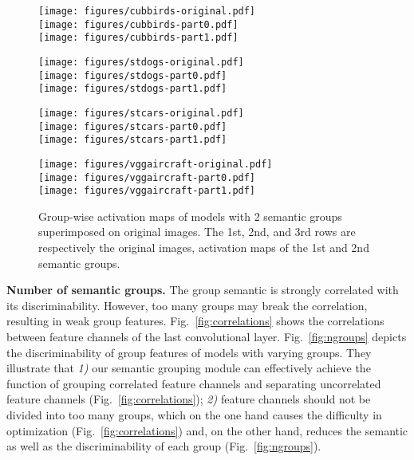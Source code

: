 \documentclass[journal]{IEEEtran}
\begin{document}
\begin{figure}[t]
\begin{center}
\begin{minipage}{0.20\linewidth}
\texttt{[image: figures/cubbirds-original.pdf]}\\
\texttt{[image: figures/cubbirds-part0.pdf]}\\
\texttt{[image: figures/cubbirds-part1.pdf]}
\end{minipage}
\begin{minipage}{0.20\linewidth}
\texttt{[image: figures/stdogs-original.pdf]}\\
\texttt{[image: figures/stdogs-part0.pdf]}\\
\texttt{[image: figures/stdogs-part1.pdf]}
\end{minipage}
\begin{minipage}{0.20\linewidth}
\texttt{[image: figures/stcars-original.pdf]}\\
\texttt{[image: figures/stcars-part0.pdf]}\\
\texttt{[image: figures/stcars-part1.pdf]}
\end{minipage}
\begin{minipage}{0.20\linewidth}
\texttt{[image: figures/vggaircraft-original.pdf]}\\
\texttt{[image: figures/vggaircraft-part0.pdf]}\\
\texttt{[image: figures/vggaircraft-part1.pdf]}
\end{minipage}
\end{center}
\caption{Group-wise activation maps of models with 2 semantic groups superimposed on original images. The 1st, 2nd, and 3rd rows are respectively the original images, activation maps of the 1st and 2nd semantic groups.}
\label{fig:visualization}
\end{figure}


\textbf{Number of semantic groups.} The group semantic is strongly correlated with its discriminability. However, too many groups may break the correlation, resulting in weak group features. Fig.~\ref{fig:correlations} shows the correlations between feature channels of the last convolutional layer. Fig.~\ref{fig:ngroups} depicts the discriminability of group features of models with varying groups. They illustrate that {\it 1)} our semantic grouping module can effectively achieve the function of grouping correlated feature channels and separating uncorrelated feature channels (Fig.~\ref{fig:correlations}); {\it 2)} feature channels should not be divided into too many groups, which on the one hand causes the difficulty in optimization (Fig.~\ref{fig:correlations}) and, on the other hand, reduces the semantic as well as the discriminability of each group (Fig.~\ref{fig:ngroups}).
\end{document}
